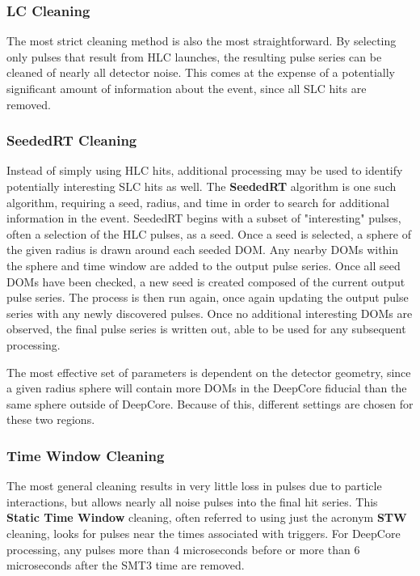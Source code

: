 \subsubsection{LC Cleaning}
The most strict cleaning method is also the most straightforward. 
By selecting only pulses that result from HLC launches, the resulting pulse series can be cleaned of nearly all detector noise.
This comes at the expense of a potentially significant amount of information about the event, since all SLC hits are removed.

\subsubsection{SeededRT Cleaning}
Instead of simply using HLC hits, additional processing may be used to identify potentially interesting SLC hits as well.
The \textbf{SeededRT} algorithm is one such algorithm, requiring a seed, radius, and time in order to search for additional information in the event.
SeededRT begins with a subset of "interesting" pulses, often a selection of the HLC pulses, as a seed.
Once a seed is selected, a sphere of the given radius is drawn around each seeded DOM. 
Any nearby DOMs within the sphere and time window are added to the output pulse series.
Once all seed DOMs have been checked, a new seed is created composed of the current output pulse series.
The process is then run again, once again updating the output pulse series with any newly discovered pulses.
Once no additional interesting DOMs are observed, the final pulse series is written out, able to be used for any subsequent processing.

The most effective set of parameters is dependent on the detector geometry, since a given radius sphere will contain more DOMs in the DeepCore fiducial than the same sphere outside of DeepCore.
Because of this, different settings are chosen for these two regions.

\subsubsection{Time Window Cleaning}
The most general cleaning results in very little loss in pulses due to particle interactions, but allows nearly all noise pulses into the final hit series.
This \textbf{Static Time Window} cleaning, often referred to using just the acronym \textbf{STW} cleaning, looks for pulses near the times associated with triggers.
For DeepCore processing, any pulses more than 4 microseconds before or more than 6 microseconds after the SMT3 time are removed.

